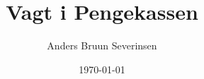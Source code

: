 

\title{Vagt i Pengekassen}
\date{\today}
\author{Anders Bruun Severinsen}



\maketitle

\tableofcontents













